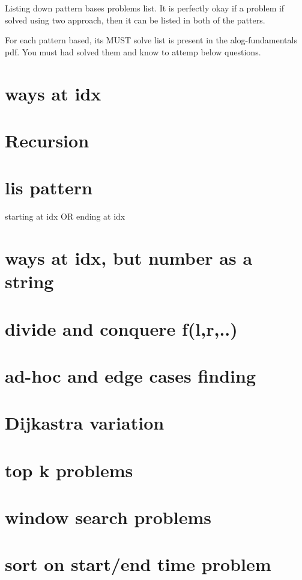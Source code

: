 
Listing down pattern bases problems list.
It is perfectly okay if a problem if solved using two approach, then it can be listed in both of the patters.

For each pattern based, its MUST solve list is present in the alog-fundamentals pdf. You must had solved them and know to attemp below questions.

\setcounter{chapter}{0}
\chapter{ways at idx}

\chapter{Recursion}
\chapter{lis pattern}
    starting at idx OR ending at idx

\chapter{ways at idx, but number as a string}

\chapter{divide and conquere f(l,r,..)}
\chapter{ad-hoc and edge cases finding}
\chapter{Dijkastra variation}
\chapter{top k problems}
\chapter{window search problems}
\chapter{sort on start/end time problem}
